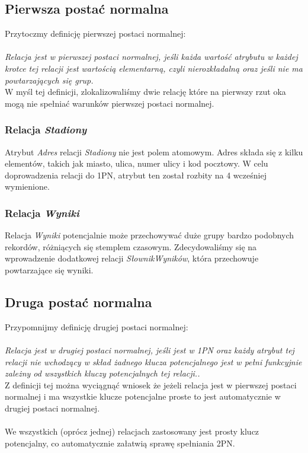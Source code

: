 \documentclass{mwrep}
\begin{document}
\subsection{Pierwsza postać normalna}
Przytoczmy definicję pierwszej postaci normalnej: \\
\\
\emph{Relacja jest w pierwszej postaci normalnej, jeśli każda wartość atrybutu
w każdej krotce tej relacji jest wartością elementarną, czyli
nierozkładalną oraz jeśli nie ma powtarzających się grup\cite{Kowalczyk1}.}\\

W myśl tej definicji, zlokalizowaliśmy dwie relację które na pierwszy rzut oka mogą nie spełniać 
warunków pierwszej postaci normalnej. 

\subsubsection{Relacja \emph{Stadiony}}
Atrybut \emph{Adres} relacji \emph{Stadiony} nie jest polem atomowym. Adres składa się z kilku elementów, takich jak
miasto, ulica, numer ulicy i kod pocztowy. W celu doprowadzenia relacji do 1PN, atrybut ten został rozbity na 4 wcześniej
wymienione.

\subsubsection{Relacja \emph{Wyniki}}
Relacja \emph{Wyniki} potencjalnie może przechowywać duże grupy bardzo podobnych rekordów, różniących się 
stemplem czasowym. Zdecydowaliśmy się na wprowadzenie dodatkowej relacji \emph{SłownikWyników}, która przechowuje powtarzające się
wyniki.

\subsection{Druga postać normalna}
Przypomnijmy definicję drugiej postaci normalnej: \\
\\
\emph{Relacja jest w drugiej postaci normalnej, jeśli jest w 1PN oraz każdy
atrybut tej relacji nie wchodzący w skład żadnego klucza potencjalnego
jest w pełni funkcyjnie zależny od wszystkich kluczy potencjalnych
tej relacji.\cite{Kowalczyk1}.}\\

Z definicji tej można wyciągnąć wniosek że jeżeli relacja jest w pierwszej postaci normalnej i ma wszystkie 
klucze potencjalne proste to jest automatycznie w drugiej postaci normalnej.\\
\\
We wszystkich (oprócz jednej) relacjach zastosowany jest prosty klucz potencjalny, co automatycznie załatwią sprawę spełniania 2PN.
\end{document}
